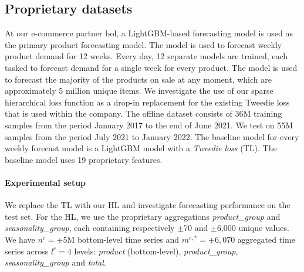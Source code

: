 \documentclass[preprint, 3p, times, twocolumn]{elsarticle}
\begin{document}
  \subsection{Proprietary datasets} \label{subsec:proprietarydatasets}
  At our e-commerce partner bol, a LightGBM-based forecasting model is used as the primary product forecasting model. The model is used to forecast weekly product demand for 12 weeks. Every day, 12 separate models are trained, each tasked to forecast demand for a single week for every product. The model is used to forecast the majority of the products on sale at any moment, which are approximately 5 million unique items. We investigate the use of our sparse hierarchical loss function as a drop-in replacement for the existing Tweedie loss that is used within the company. The off\-line dataset consists of 36M training samples from the period January 2017 to the end of June 2021. We test on 55M samples from the period July 2021 to January 2022. The baseline model for every weekly forecast model is a LightGBM model with a \textit{Tweedie loss} (TL). The baseline model uses 19 proprietary features. 
  
  \paragraph{Experimental setup} We replace the TL with our HL and investigate forecasting performance on the test set. For the HL, we use the proprietary aggregations \textit{product\_group} and \textit{seasonality\_group}, each containing respectively $\pm$70 and $\pm$6,000 unique values. We have \(n^c = \pm5\)M bottom-level time series and \(m^{c,*} = \pm6,070\) aggregated time series across \(l^c = 4\) levels: \textit{product} (bottom-level), \textit{product\_group}, \textit{seasonality\_group} and \textit{total}.
\end{document}
